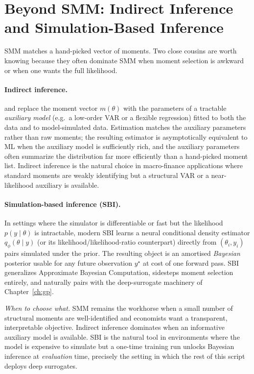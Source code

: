 \documentclass[11pt,a4paper]{report}
\begin{document}
\section{Beyond SMM: Indirect Inference and Simulation-Based Inference}
\label{sec:beyond_smm}

SMM matches a hand-picked vector of moments.  Two close cousins are worth knowing because they often dominate SMM when moment selection is awkward or when one wants the full likelihood.

\paragraph{Indirect inference.}  \citet{smith1993estimating} and \citet{gourieroux1993indirect} replace the moment vector $m(\theta)$ with the parameters of a tractable \emph{auxiliary model} (e.g.\ a low-order VAR or a flexible regression) fitted to both the data and to model-simulated data.  Estimation matches the auxiliary parameters rather than raw moments; the resulting estimator is asymptotically equivalent to ML when the auxiliary model is sufficiently rich, and the auxiliary parameters often summarize the distribution far more efficiently than a hand-picked moment list.  Indirect inference is the natural choice in macro-finance applications where standard moments are weakly identifying but a structural VAR or a near-likelihood auxiliary is available.

\paragraph{Simulation-based inference (SBI).}  In settings where the simulator is differentiable or fast but the likelihood $p(y \mid \theta)$ is intractable, modern SBI \citep{cranmer2020frontier} learns a neural conditional density estimator $q_\phi(\theta \mid y)$ (or its likelihood/likelihood-ratio counterpart) directly from $(\theta_i, y_i)$ pairs simulated under the prior.  The resulting object is an amortised \emph{Bayesian} posterior usable for any future observation $y^\star$ at cost of one forward pass.  SBI generalizes Approximate Bayesian Computation, sidesteps moment selection entirely, and naturally pairs with the deep-surrogate machinery of Chapter~\ref{ch:gp}.

\medskip
\noindent\emph{When to choose what.}  SMM remains the workhorse when a small number of structural moments are well-identified and economists want a transparent, interpretable objective.  Indirect inference dominates when an informative auxiliary model is available.  SBI is the natural tool in environments where the model is expensive to simulate but a one-time training run unlocks Bayesian inference at \emph{evaluation} time, precisely the setting in which the rest of this script deploys deep surrogates.
\end{document}
